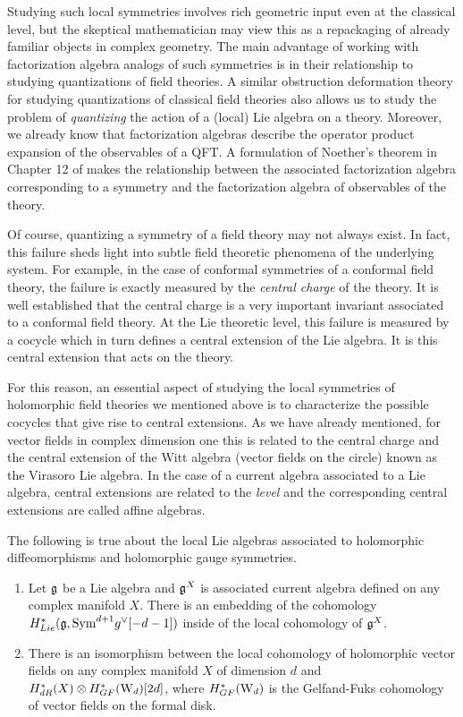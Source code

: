 Studying such local symmetries involves rich geometric input even at the classical level, but the skeptical mathematician may view this as a repackaging of already familiar objects in complex geometry.
The main advantage of working with factorization algebra analogs of such symmetries is in their relationship to studying quantizations of field theories.
A similar obstruction deformation theory for studying quantizations of classical field theories also allows us to study the problem of {\em quantizing} the action of a (local) Lie algebra on a theory.
Moreover, we already know that factorization algebras describe the operator product expansion of the observables of a QFT.
A formulation of Noether's theorem in Chapter 12 of \cite{CG2} makes the relationship between the associated factorization algebra corresponding to a symmetry and the factorization algebra of observables of the theory.

Of course, quantizing a symmetry of a field theory may not always exist.
In fact, this failure sheds light into subtle field theoretic phenomena of the underlying system. 
For example, in the case of conformal symmetries of a conformal field theory, the failure is exactly measured by the {\em central charge} of the theory. 
It is well established that the central charge is a very important invariant associated to a conformal field theory.
At the Lie theoretic level, this failure is measured by a cocycle which in turn defines a central extension of the Lie algebra. 
It is this central extension that acts on the theory. 

For this reason, an essential aspect of studying the local symmetries of holomorphic field theories we mentioned above is to characterize the possible cocycles that give rise to central extensions. 
As we have already mentioned, for vector fields in complex dimension one this is related to the central charge and the central extension of the Witt algebra (vector fields on the circle) known as the Virasoro Lie algebra.
In the case of a current algebra associated to a Lie algebra, central extensions are related to the {\em level} and the corresponding central extensions are called affine algebras. 

\begin{thm}\label{thm: chap3 1}
The following is true about the local Lie algebras associated to holomorphic diffeomorphisms and holomorphic gauge symmetries.
\begin{enumerate}
\item Let $\mathfrak g$ be a Lie algebra and $\mathfrak g^X$ is associated current algebra defined on any complex manifold $X$. 
There is an embedding of the cohomology $H^*_{Lie}(\mathfrak g , {\rm Sym}^{d+1} g^\vee [-d-1])$ inside of the local cohomology of $\mathfrak g^X$.
\item There is an isomorphism between the local cohomology of holomorphic vector fields on any complex manifold $X$ of dimension $d$ and $H_{dR}^*(X) \otimes H^*_{GF}({\rm W}_d)[2d]$, where  $H^*_{GF}({\rm W}_d)$ is the Gelfand-Fuks cohomology of vector fields on the formal disk.
\end{enumerate}
\end{thm}

